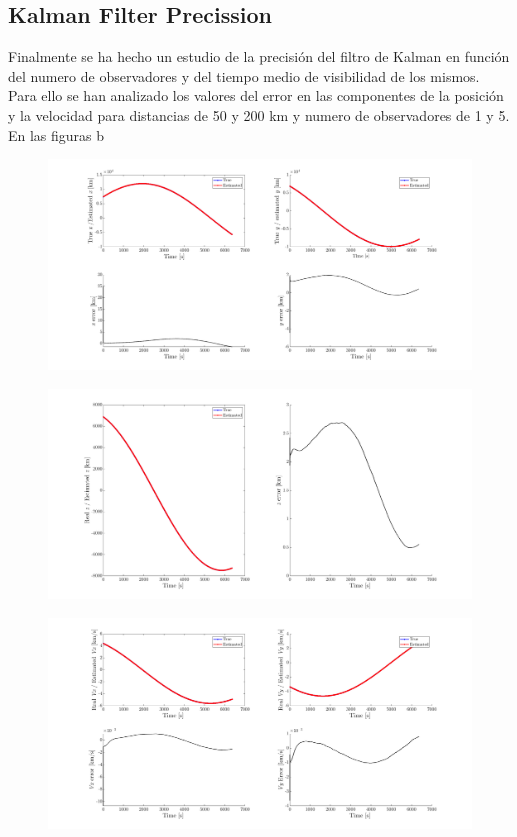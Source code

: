 \subsection{Kalman Filter Precission}
Finalmente se ha hecho un estudio de la precisión del filtro de Kalman en función del numero de observadores y del tiempo medio de visibilidad de los mismos. Para ello se han analizado los valores del error en las componentes de la posición y la velocidad para distancias de 50 y 200 km y numero de observadores de 1 y 5. En las figuras b
\begin{figure}[H]
    \centering
    \includegraphics[width=\textwidth]{Figures/xy-error-5observers-50km.png}
    \caption{}
    \label{fig: xyerror-50-5}
\end{figure}
\begin{figure}[H]
    \centering
    \includegraphics[width=\textwidth]{Figures/z-error-5observers-50km.png}
    \caption{}
    \label{fig: zerror-50-5}
\end{figure}
\begin{figure}[H]
    \centering
    \includegraphics[width=\textwidth]{Figures/Vx-vy-error-5observers-50km.png}
    \caption{}
    \label{fig: vxyerror-50-5}
\end{figure}
